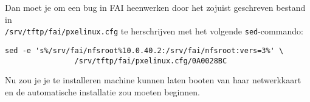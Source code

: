 \documentclass[12pt,a4paper]{article}
\begin{document}
Dan moet je om een bug in FAI heenwerken door het zojuist geschreven bestand in \\ \texttt{/srv/tftp/fai/pxelinux.cfg} te herschrijven met het volgende \texttt{sed}-commando:
\begin{lstlisting}
sed -e 's%/srv/fai/nfsroot%10.0.40.2:/srv/fai/nfsroot:vers=3%' \
				/srv/tftp/fai/pxelinux.cfg/0A0028BC
\end{lstlisting}

Nu zou je je te installeren machine kunnen laten booten van haar netwerkkaart en de automatische installatie zou moeten beginnen.
\end{document}
